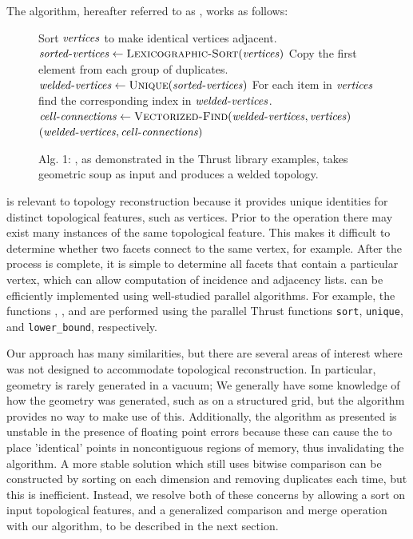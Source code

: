 \documentclass[10pt,journal,cspaper,compsoc]{IEEEtran}
\begin{document}
The algorithm, hereafter referred to as , works as follows:
\begin{figure}
\vspace{-0.3cm}
\begin{codebox}
  \zi \Comment Sort $\id{vertices}$ to make identical vertices adjacent.
  \li $\id{sorted-vertices} \gets \proc{Lexicographic-Sort}(\id{vertices})$
  \zi \Comment Copy the first element from each group of duplicates.
  \li $\id{welded-vertices} \gets \proc{Unique}(\id{sorted-vertices})$
  \zi \Comment For each item in $\id{vertices}$ find the corresponding index
  \zi \Comment in $\id{welded-vertices}$.
  \li $\id{cell-connections} \gets \proc{Vectorized-Find}(\id{welded-vertices},\id{vertices})$
  \li \Return $( \id{welded-vertices}, \id{cell-connections} )$
\end{codebox}
\vspace{-0.5cm}
\caption*{Alg. 1: , as demonstrated in the Thrust library examples, takes geometric soup as input and produces a welded topology.}
\end{figure}

 is relevant to topology reconstruction because it provides unique identities for distinct topological features, such as vertices. Prior to the operation there may exist many instances of the same topological feature. This makes it difficult to determine whether two facets connect to the same vertex, for example. After the  process is complete, it is simple to determine all facets that contain a particular vertex, which can allow computation of incidence and adjacency lists.   can be efficiently implemented using well-studied parallel algorithms.  For example, the functions ,
, and  are performed using the parallel
Thrust functions \texttt{sort}, \texttt{unique}, and \texttt{lower\_bound},
respectively.

Our approach has many similarities, but there are several areas of interest where  was not designed to accommodate topological reconstruction. In particular, geometry is rarely generated in a vacuum; We generally have some knowledge of how the geometry was generated, such as on a structured grid, but the  algorithm provides no way to make use of this. Additionally, the  algorithm as presented is unstable in the presence of floating point errors because these can cause the  to place 'identical' points in noncontiguous regions of memory, thus invalidating the algorithm. A more stable solution which still uses bitwise comparison can be constructed by sorting on each dimension and removing duplicates each time, but this is inefficient. Instead, we resolve both of these concerns by allowing a sort on input topological features, and a generalized comparison and merge operation with our algorithm, to be described in the next section.
\end{document}
